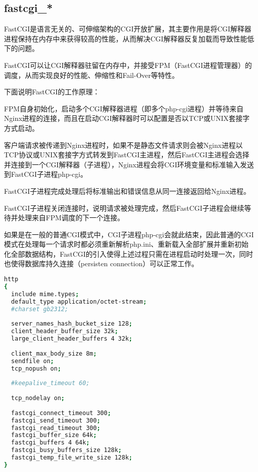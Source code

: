 \subsection{fastcgi\_*}

FastCGI是语言无关的、可伸缩架构的CGI开放扩展，其主要作用是将CGI解释器进程保持在内存中来获得较高的性能，从而解决CGI解释器反复加载而导致性能低下的问题。

FastCGI可以让CGI解释器驻留在内存中，并接受FPM（FastCGI进程管理器）的调度，从而实现良好的性能、伸缩性和Fail-Over等特性。

下面说明FastCGI的工作原理：

\begin{compactitem}
\item FPM自身初始化，启动多个CGI解释器进程（即多个php-cgi进程）并等待来自Nginx进程的连接，而且在启动CGI解释器时可以配置是否以TCP或UNIX套接字方式启动。

\item 客户端请求被传递到Nginx进程时，如果不是静态文件请求则会被Nginx进程以TCP协议或UNIX套接字方式转发到FastCGI主进程，然后FastCGI主进程会选择并连接到一个CGI解释器（子进程），Nginx进程会将CGI环境变量和标准输入发送到FastCGI子进程php-cgi。

\item FastCGI子进程完成处理后将标准输出和错误信息从同一连接返回给Nginx进程。

\item FastCGI子进程关闭连接时，说明请求被处理完成，然后FastCGI子进程会继续等待并处理来自FPM调度的下一个连接。

如果是在一般的普通CGI模式中，CGI子进程php-cgi会就此结束，因此普通的CGI模式在处理每一个请求时都必须重新解析php.ini、重新载入全部扩展并重新初始化全部数据结构，FastCGI的引入使得上述过程只需在进程启动时处理一次，同时也使得数据库持久连接（persisten connection）可以正常工作。
\end{compactitem}



\begin{lstlisting}[language=bash]
http
{
  include mime.types;
  default_type application/octet-stream;
  #charset gb2312;
  
  server_names_hash_bucket_size 128;
  client_header_buffer_size 32k;
  large_client_header_buffers 4 32k;
  
  client_max_body_size 8m;
  sendfile on;
  tcp_nopush on;
  
  #keepalive_timeout 60;
  
  tcp_nodelay on;
  
  fastcgi_connect_timeout 300;
  fastcgi_send_timeout 300;
  fastcgi_read_timeout 300;
  fastcgi_buffer_size 64k;
  fastcgi_buffers 4 64k;
  fastcgi_busy_buffers_size 128k;
  fastcgi_temp_file_write_size 128k;
}
\end{lstlisting}



